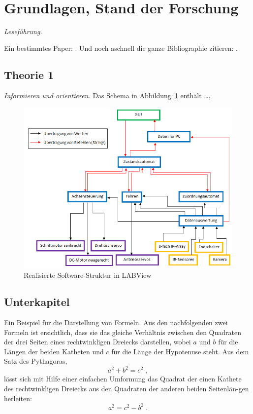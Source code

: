 \section{Grundlagen, Stand der Forschung}

\emph{Leseführung.} \lipsum[6-6]

Ein bestimmtes Paper: \cite{h_schmid_approximating_2000}. Und noch aschnell die ganze Bibliographie zitieren: \cite{*}.

\subsection{Theorie 1}

\emph{Informieren und orientieren.} Das Schema in Abbildung~\ref{fig:software_struktur} enthält \ldots, \lipsum[7-7]

\begin{figure}[b]
\begin{center}
\includegraphics[width=\linewidth]{graphics/software_struktur.png}
\end{center}
\caption{Realisierte Software-Struktur in LABView}
\label{fig:software_struktur}
\end{figure}

\subsection{Unterkapitel}

Ein Beispiel für die Darstellung von Formeln. Aus den nachfolgenden zwei Formeln ist ersichtlich, dass sie das gleiche Verhältnis zwischen den Quadraten der drei Seiten eines rechtwinkligen Dreiecks darstellen, wobei $a$ und $b$ für die Längen der beiden Katheten und $c$ für die Länge der Hypotenuse steht. Aus dem Satz des Pythagoras,
\begin{equation}
a^2+b^2=c^2\;,
\end{equation}
lässt sich mit Hilfe einer einfachen Umformung das Quadrat der einen Kathete des rechtwinkligen Dreiecks aus den Quadraten der anderen beiden Seitenlän-gen herleiten:
\begin{equation}
a^2=c^2-b^2\;.
\end{equation}

